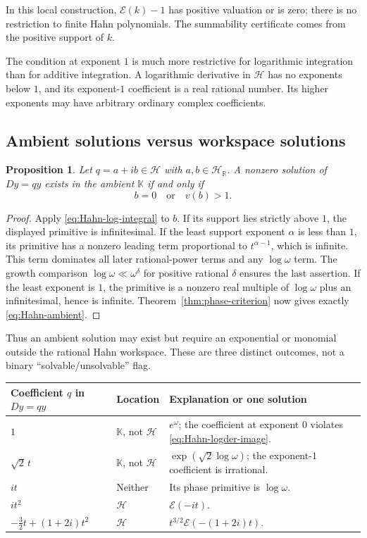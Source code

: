 \documentclass[11pt,a4paper]{article}
\numberwithin{equation}{section}
\newtheorem{proposition}[theorem]{Proposition}
\theoremstyle{definition}
\theoremstyle{remark}
\newcommand{\K}{\mathbb K}
\newcommand{\R}{\mathbb R}
\newcommand{\HH}{\mathscr H}
\newcommand{\EE}{\mathcal E}
\begin{document}
In this local construction, $\EE(k)-1$ has positive valuation or is zero;
there is no restriction to finite Hahn polynomials. The summability certificate comes from the positive
support of $k$.

The condition at exponent $1$ is much more restrictive for logarithmic
integration than for additive integration. A logarithmic derivative in
$\HH$ has no exponents below $1$, and its exponent-$1$ coefficient is a
real rational number. Its higher exponents may have arbitrary ordinary
complex coefficients.

\subsection{Ambient solutions versus workspace solutions}

\begin{proposition}\label{prop:Hahn-ambient}
Let $q=a+ib\in\HH$ with $a,b\in\HH_\R$. A nonzero solution of $Dy=qy$
exists in the ambient $\K$ if and only if
\begin{equation}\label{eq:Hahn-ambient}
 b=0\quad\text{or}\quad v(b)>1.
\end{equation}
\end{proposition}
\begin{proof}
Apply \eqref{eq:Hahn-log-integral} to $b$. If its support lies strictly
above $1$, the displayed primitive is infinitesimal.
If the least support exponent $\alpha$ is less than $1$, its primitive
has a nonzero leading term proportional to $t^{\alpha-1}$, which is
infinite. This term dominates all later rational-power terms and any
$\log\omega$ term. The growth comparison
$\log\omega\ll\omega^\delta$ for positive rational $\delta$ ensures the
last assertion. If the least exponent is $1$, the primitive is a nonzero
real multiple of $\log\omega$ plus an infinitesimal, hence is infinite.
Theorem~\ref{thm:phase-criterion} now gives exactly
\eqref{eq:Hahn-ambient}.
\end{proof}

Thus an ambient solution may exist but require an exponential or monomial
outside the rational Hahn workspace. These are three distinct outcomes,
not a binary ``solvable/unsolvable'' flag.

\begin{center}
\small
\begin{tabular}{@{}p{}p{}p{}@{}}
\toprule
Coefficient $q$ in $Dy=qy$ & Location & Explanation or one solution\\
\midrule
$1$ & $\K$, not $\HH$ & $e^\omega$; the coefficient at exponent $0$ violates \eqref{eq:Hahn-logder-image}.\\[4pt]
$\sqrt2\,t$ & $\K$, not $\HH$ & $\exp(\sqrt2\log\omega)$; the exponent-$1$ coefficient is irrational.\\[4pt]
$it$ & Neither & Its phase primitive is $\log\omega$.\\[4pt]
$it^2$ & $\HH$ & $\EE(-it)$.\\[4pt]
$-\tfrac32t+(1+2i)t^2$ & $\HH$ & $t^{3/2}\EE(-(1+2i)t)$.\\
\bottomrule
\end{tabular}
\end{center}
\end{document}
